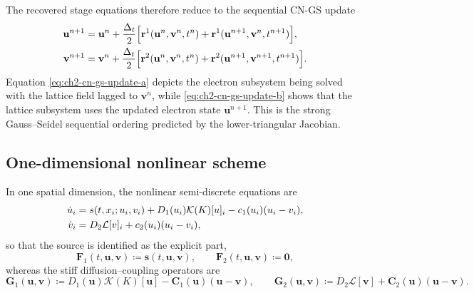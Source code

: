 \noindent
The recovered stage equations therefore reduce to the sequential CN-GS update
\begin{subequations}\label{eq:ch2-cn-gs-update}
    \begin{align}
        \mathbf{u}^{n+1}
         & =
        \mathbf{u}^{n}
        +
        \frac{\Delta_t}{2}
        \Bigl[
            \mathbf{r}^{1}(\mathbf{u}^{n},\mathbf{v}^{n},t^{n})
            +
            \mathbf{r}^{1}(\mathbf{u}^{n+1},\mathbf{v}^{n},t^{n+1})
            \Bigr],
        \label{eq:ch2-cn-gs-update-a} \\
        \mathbf{v}^{n+1}
         & =
        \mathbf{v}^{n}
        +
        \frac{\Delta_t}{2}
        \Bigl[
            \mathbf{r}^{2}(\mathbf{u}^{n},\mathbf{v}^{n},t^{n})
            +
            \mathbf{r}^{2}(\mathbf{u}^{n+1},\mathbf{v}^{n+1},t^{n+1})
            \Bigr].
        \label{eq:ch2-cn-gs-update-b}
    \end{align}
\end{subequations}
Equation \eqref{eq:ch2-cn-gs-update-a} depicts the electron subsystem being solved with the lattice field lagged to \(\mathbf{v}^{n}\), while \eqref{eq:ch2-cn-gs-update-b} shows that the lattice subsystem uses the updated electron state \(\mathbf{u}^{n+1}\). This is the strong Gauss--Seidel sequential ordering predicted by the lower-triangular Jacobian.

\subsection{One-dimensional nonlinear scheme}
\label{sec:ch2-nonlinear-1d}

In one spatial dimension, the nonlinear semi-discrete equations are
\begin{align}
    \dot{u}_i
     & =
    s(t,x_i;u_i,v_i)
    +
    D_1(u_i)\mathcal{K}(K)[u]_i
    -
    c_1(u_i)(u_i-v_i),
    \notag \\
    \dot{v}_i
     & =
    D_2 \mathcal{L}[v]_i
    +
    c_2(u_i)(u_i-v_i),
    \notag
\end{align}
so that the source is identified as the explicit part,
\[
    \mathbf{F}_1(t,\mathbf{u},\mathbf{v}) \coloneqq \mathbf{s}(t,\mathbf{u},\mathbf{v}),
    \qquad
    \mathbf{F}_2(t,\mathbf{u},\mathbf{v}) \coloneqq \mathbf{0},
\]
whereas the stiff diffusion--coupling operators are
\[
    \mathbf{G}_1(\mathbf{u},\mathbf{v}) \coloneqq D_1(\mathbf{u})\mathcal{K}(K)[\mathbf{u}] - \mathbf{C}_1(\mathbf{u})(\mathbf{u}-\mathbf{v}),
    \qquad
    \mathbf{G}_2(\mathbf{u},\mathbf{v}) \coloneqq D_2 \mathcal{L}[\mathbf{v}] + \mathbf{C}_2(\mathbf{u})(\mathbf{u}-\mathbf{v}).
\]

